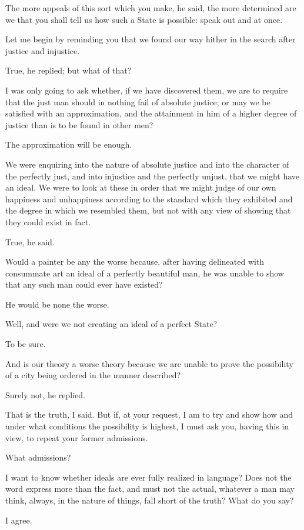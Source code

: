 The more appeals of this sort which you make, he said, the more
determined are we that you shall tell us how such a State is possible:
speak out and at once.

Let me begin by reminding you that we found our way hither in the search
after justice and injustice.

True, he replied; but what of that?

I was only going to ask whether, if we have discovered them, we are to
require that the just man should in nothing fail of absolute justice; or
may we be satisfied with an approximation, and the attainment in him of
a higher degree of justice than is to be found in other men?

The approximation will be enough.

We were enquiring into the nature of absolute justice and into the
character of the perfectly just, and into injustice and the perfectly
unjust, that we might have an ideal. We were to look at these in order
that we might judge of our own happiness and unhappiness according to
the standard which they exhibited and the degree in which we resembled
them, but not with any view of showing that they could exist in fact.

True, he said.

Would a painter be any the worse because, after having delineated with
consummate art an ideal of a perfectly beautiful man, he was unable to
show that any such man could ever have existed?

He would be none the worse.

Well, and were we not creating an ideal of a perfect State?

To be sure.

And is our theory a worse theory because we are unable to prove the
possibility of a city being ordered in the manner described?

Surely not, he replied.

That is the truth, I said. But if, at your request, I am to try and show
how and under what conditions the possibility is highest, I must ask
you, having this in view, to repeat your former admissions.

What admissions?

I want to know whether ideals are ever fully realized in language?
Does not the word express more than the fact, and must not the actual,
whatever a man may think, always, in the nature of things, fall short of
the truth? What do you say?

I agree.

